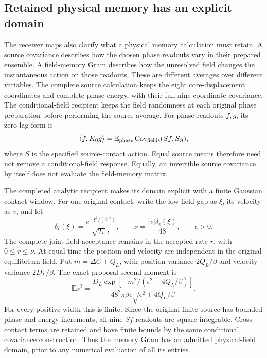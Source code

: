 \subsection{Retained physical memory has an explicit domain}

The receiver maps also clarify what a physical memory calculation must retain. A source covariance describes how the chosen phase readouts vary in their prepared ensemble. A field-memory Gram describes how the unresolved field changes the instantaneous action on those readouts. These are different averages over different variables. The complete source calculation keeps the eight core-displacement coordinates and complete phase energy, with their full nine-coordinate covariance. The conditional-field recipient keeps the field randomness at each original phase preparation before performing the source average. For phase readouts $f,g$, its zero-lag form is
\begin{equation}
 \langle f,K_0g\rangle
 =\mathbb E_{\rm phase}\operatorname{Cov}_{\rm fields}(Sf,Sg),
\end{equation}
where $S$ is the specified source-contact action. Equal source means therefore need not remove a conditional-field response. Equally, an invertible source covariance by itself does not evaluate the field-memory matrix.

The completed analytic recipient makes its domain explicit with a finite Gaussian contact window. For one original contact, write the low-field gap as $\xi$, its velocity as $v$, and let
\begin{equation}
 \delta_\epsilon(\xi)=\frac{e^{-\xi^2/(2\epsilon^2)}}{\sqrt{2\pi}\epsilon},
 \qquad \nu=\frac{|v|\delta_\epsilon(\xi)}{48},
 \qquad \epsilon>0.
\end{equation}
The complete joint-field acceptance remains in the accepted rate $r$, with $0\leq r\leq\nu$. At equal time the position and velocity are independent in the original equilibrium field. Put $m=\Delta C+Q_L$, with position variance $2Q_L/\beta$ and velocity variance $2D_L/\beta$. The exact proposal second moment is
\begin{equation}
 \mathbb E\nu^2=
 \frac{D_L\exp[-m^2/(\epsilon^2+4Q_L/\beta)]}
 {48^2\pi\beta\epsilon\sqrt{\epsilon^2+4Q_L/\beta}}.
\end{equation}
For every positive width this is finite. Since the original finite source has bounded phase and energy increments, all nine $Sf$ readouts are square integrable. Cross-contact terms are retained and have finite bounds by the same conditional covariance construction. Thus the memory Gram has an admitted physical-field domain, prior to any numerical evaluation of all its entries.

